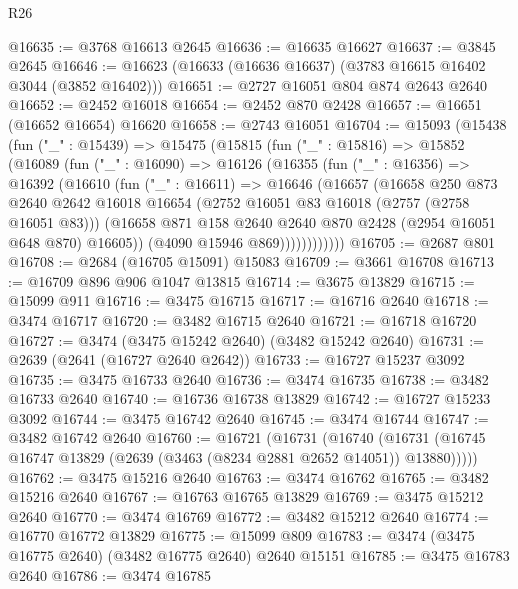 \begin{lexlean}{R26}
\begin{coremodule}
@16635 := @3768 @16613 @2645
@16636 := @16635 @16627
@16637 := @3845 @2645
@16646 := @16623 (@16633 (@16636 @16637) (@3783 @16615 @16402 @3044 (@3852 @16402)))
@16651 := @2727 @16051 @804 @874 @2643 @2640
@16652 := @2452 @16018
@16654 := @2452 @870 @2428
@16657 := @16651 (@16652 @16654) @16620
@16658 := @2743 @16051
@16704 := @15093
    (@15438
      (fun ("_" : @15439) =>
      @15475
        (@15815
          (fun ("_" : @15816) =>
          @15852
            (@16089
              (fun ("_" : @16090) =>
              @16126
                (@16355
                  (fun ("_" : @16356) =>
                  @16392
                    (@16610
                      (fun ("_" : @16611) =>
                      @16646
                        (@16657
                          (@16658
                            @250
                            @873
                            @2640
                            @2642
                            @16018
                            @16654
                            (@2752 @16051 @83 @16018 (@2757 (@2758 @16051 @83)))
                            (@16658
                              @871
                              @158
                              @2640
                              @2640
                              @870
                              @2428
                              (@2954 @16051 @648 @870)
                              @16605))
                          (@4090 @15946 @869))))))))))))
@16705 := @2687 @801
@16708 := @2684 (@16705 @15091) @15083
@16709 := @3661 @16708
@16713 := @16709 @896 @906 @1047 @13815
@16714 := @3675 @13829
@16715 := @15099 @911
@16716 := @3475 @16715
@16717 := @16716 @2640
@16718 := @3474 @16717
@16720 := @3482 @16715 @2640
@16721 := @16718 @16720
@16727 := @3474 (@3475 @15242 @2640) (@3482 @15242 @2640)
@16731 := @2639 (@2641 (@16727 @2640 @2642))
@16733 := @16727 @15237 @3092
@16735 := @3475 @16733 @2640
@16736 := @3474 @16735
@16738 := @3482 @16733 @2640
@16740 := @16736 @16738 @13829
@16742 := @16727 @15233 @3092
@16744 := @3475 @16742 @2640
@16745 := @3474 @16744
@16747 := @3482 @16742 @2640
@16760 := @16721
    (@16731
      (@16740 (@16731 (@16745 @16747 @13829 (@2639 (@3463 (@8234 @2881 @2652 @14051)) @13880)))))
@16762 := @3475 @15216 @2640
@16763 := @3474 @16762
@16765 := @3482 @15216 @2640
@16767 := @16763 @16765 @13829
@16769 := @3475 @15212 @2640
@16770 := @3474 @16769
@16772 := @3482 @15212 @2640
@16774 := @16770 @16772 @13829
@16775 := @15099 @809
@16783 := @3474 (@3475 @16775 @2640) (@3482 @16775 @2640) @2640 @15151
@16785 := @3475 @16783 @2640
@16786 := @3474 @16785

\end{coremodule}
\end{lexlean}
